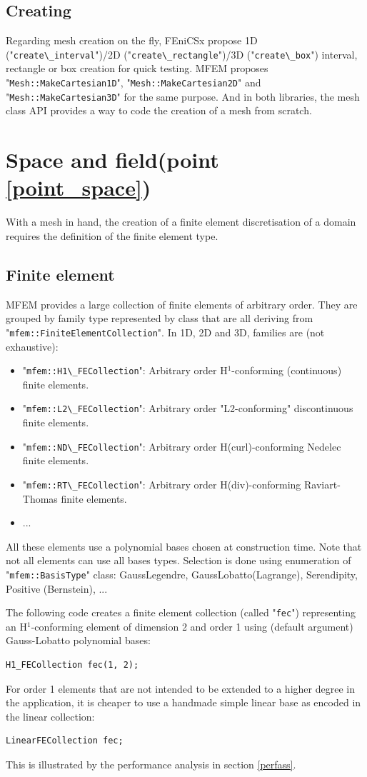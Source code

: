 \documentclass[12pt]{article}
\newcommand{\f}[1]{FEniCSx#1}
\newcommand{\mycode}[1]{\textsf{"}\lstinline`#1`\textsf{"}}
\begin{document}
\subsection{Creating}
Regarding mesh creation on the fly, \f{} propose 1D (\mycode{create\_interval})/2D (\mycode{create\_rectangle})/3D (\mycode{create\_box}) interval, rectangle or box creation for quick testing. MFEM proposes \mycode{Mesh::MakeCartesian1D}, \mycode{Mesh::MakeCartesian2D} and \mycode{Mesh::MakeCartesian3D} for the same purpose.
And in both libraries, the mesh class API provides a way to code the creation of a mesh from scratch.
 

\section{Space and field(point \ref{point_space})\label{spaceField}}
With a mesh in hand, the creation of a finite element discretisation of a domain requires the definition of the finite element type.
\subsection{Finite element}
MFEM provides a large collection of finite elements of arbitrary order. They are grouped by family type represented by class that are all deriving from \mycode{mfem::FiniteElementCollection}. In 1D, 2D and 3D, families are (not exhaustive):
\begin{itemize}
	\item \mycode{mfem::H1\_FECollection}: Arbitrary order H$^1$-conforming (continuous) finite elements. 
	\item \mycode{mfem::L2\_FECollection}: Arbitrary order "L2-conforming" discontinuous finite elements.
	\item \mycode{mfem::ND\_FECollection}: Arbitrary order H(curl)-conforming Nedelec finite elements.
	\item \mycode{mfem::RT\_FECollection}: Arbitrary order H(div)-conforming Raviart-Thomas finite elements.
	\item ...
\end{itemize}
All these elements use a polynomial bases chosen at construction time. Note that not all elements can use all bases types. Selection is done using enumeration  of \mycode{mfem::BasisType} class: GaussLegendre, GaussLobatto(Lagrange), Serendipity, Positive (Bernstein), ...

The following code creates a finite element collection (called \mycode{fec}) representing an H$^1$-conforming element of dimension 2 and order 1 using (default argument) Gauss-Lobatto polynomial bases:\begin{lstlisting}[numbers=none,basicstyle=\footnotesize,label=feca]
H1_FECollection fec(1, 2);
\end{lstlisting}
For order 1 elements that are not intended to be extended to a higher degree in the application, it is cheaper to use a handmade simple linear base as encoded in the linear collection:\begin{lstlisting}[numbers=none,basicstyle=\footnotesize,label=fec]
LinearFECollection fec;
\end{lstlisting}
This is illustrated by the performance analysis in section \ref{perfass}.
\end{document}
